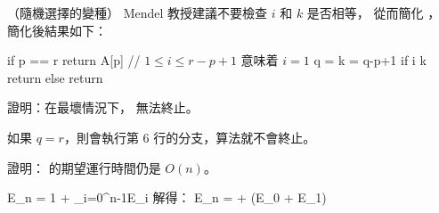 \startPROBLEM
（隨機選擇的變種）
 Mendel 教授建議不要檢查 $i$ 和 $k$ 是否相等，
從而簡化 ，
簡化後結果如下：

\startCLRSCODE
if p == r
	return A[p]	// $1\le i \le r-p+1$ 意味着 $i=1$
q = 
k = q-p+1
if i \le k
	return 
else
	return 
\stopCLRSCODE

\startigBase[a]\startitem
證明：在最壞情況下， 無法終止。
\stopitem\stopigBase

\startANSWER
如果 $q=r$，則會執行第 6 行的分支，算法就不會終止。
\stopANSWER

\startigBase[continue]\startitem
證明：  的期望運行時間仍是 $O(n)$。
\stopitem\stopigBase

\startANSWER
\startformula
E_n = 1 + \sum_{i=0}^{n-1}E_i
\stopformula
解得：
\startformula
E_n =  + (E_0 + E_1)
\stopformula
\stopANSWER
\stopPROBLEM
